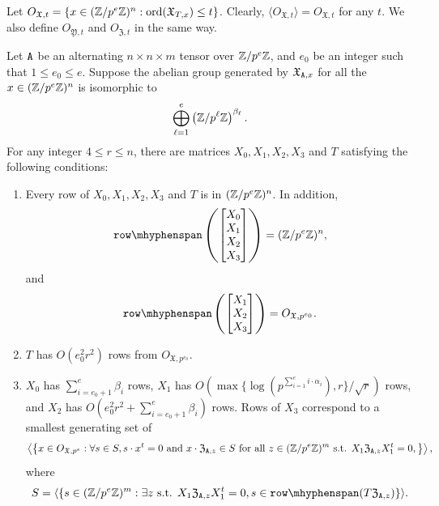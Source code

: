 Let $O_{\mathfrak{X}, t} = \{x \in (\mathbb{Z} / p^{e} \mathbb{Z})^n : \mathrm{ord}(\mathfrak{X}_{T, x}) \leq t\}$. Clearly, $\langle O_{\mathfrak{X}, t} \rangle = O_{\mathfrak{X}, t}$ for any $t$.
We also define $O_{\mathfrak{Y}, t}$ and $O_{\mathfrak{Z}, t} $  in the same way.

\begin{lemma}\label{lem:enumeration}
Let $\mathtt{A}$ be an alternating $n \times n \times m$ tensor over $\mathbb{Z} / p^{e} \mathbb{Z}$, and $e_0$ be an integer such that $1 \leq e_0 \leq e$. %
Suppose the abelian group generated by $\mathfrak{X}_{\mathtt{A}, x}$ for all the $x \in (\mathbb{Z} / p^{e}\mathbb{Z})^n$ is isomorphic to 
\[\bigoplus_{\ell = 1}^{e} \left(\mathbb{Z} / p^{\ell } \mathbb{Z}\right)^{\beta_\ell}.\]
For any integer $4 \leq r \leq n$, 
there are matrices $X_0, X_1, X_2, X_3$ and $T$ satisfying the following conditions:
\begin{enumerate}
\item Every row of $X_0, X_1, X_2, X_3$ and $T$ is in $(\mathbb{Z} / p^{e} \mathbb{Z})^n$. In addition, 
\[\rowspan\left(\begin{bmatrix} X_0\\ X_1 \\ X_2 \\ X_3\end{bmatrix}\right) = (\Z / p^{e} \Z)^n,\]
and 
\[\rowspan\left(\begin{bmatrix} X_1 \\ X_2 \\ X_3\end{bmatrix}\right) = O_{\mathfrak{X}, p^{e_0}}.\]
\item $T$ has $O(e_0^2 r^2)$ rows from $O_{\mathfrak{X}, p^{e_0}}$. %



\item $X_0$ has $\sum_{i = e_0+ 1}^{e} \beta_i$ rows, $X_1$ has 
$O(\max\{\log(p^{\sum_{i = 1}^{e} i \cdot \alpha_i}), r\} /  \sqrt{r} )$ rows, and
$X_2$ has $O(e_0^2 r^2 + \sum_{i = e_0 + 1}^{e} \beta_i)$ rows. 
Rows of $X_3$ correspond to a smallest generating set of 
\[\left\langle \left\{x \in O_{\mathfrak{X}, p^e} : \forall s \in S, s \cdot x^t = 0 \text{ and } 
x \cdot \mathfrak{Z}_{\mathtt{A}, z} \in S \text{ for all } z \in (\mathbb{Z} / p^e \mathbb{Z})^m \text{ s.t. } X_1  \mathfrak{Z}_{\mathtt{A}, z} X_1^t = 0,   \right\}\right\rangle,\]
where \[S = \langle \{s  \in (\Z / p^e \Z)^m : \exists z  \text{ s.t. }X_1 \mathfrak{Z}_{\tA, z} X_1^t = 0, s \in \rowspan(T \mathfrak{Z}_{\tA, z})\}\rangle.\]


\end{enumerate}
\end{lemma}
